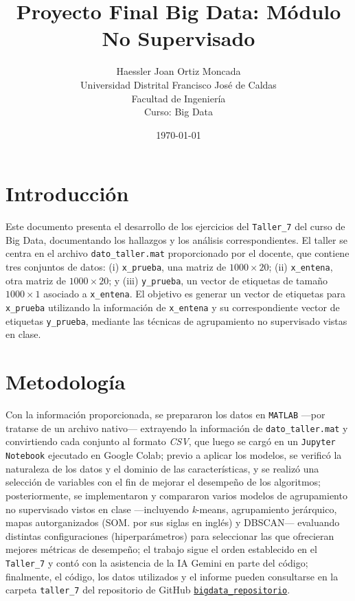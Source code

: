 \documentclass[12pt,a4paper]{article}
\title{\textbf{Proyecto Final Big Data: Módulo No Supervisado}}
\author{Haessler Joan Ortiz Moncada \\[0.5cm]
        Universidad Distrital Francisco José de Caldas \\
        Facultad de Ingeniería \\
        Curso: Big Data}
\date{\today}
\begin{document}
\maketitle

\section{Introducción}
Este documento presenta el desarrollo de los ejercicios del \texttt{Taller\_7} del curso de 
Big Data, documentando los hallazgos y los análisis correspondientes. El taller se centra en 
el archivo \texttt{dato\_taller.mat} proporcionado por el docente, que contiene tres conjuntos 
de datos: (i) \texttt{x\_prueba}, una matriz de \(1000\times 20\); (ii) \texttt{x\_entena}, 
otra matriz de \(1000\times 20\); y (iii) \texttt{y\_prueba}, un vector de etiquetas de tamaño 
\(1000\times 1\) asociado a \texttt{x\_entena}. El objetivo es generar un vector de etiquetas 
para \texttt{x\_prueba} utilizando la información de \texttt{x\_entena} y su correspondiente 
vector de etiquetas \texttt{y\_prueba}, mediante las técnicas de agrupamiento no supervisado 
vistas en clase.

\section{Metodología}
Con la información proporcionada, se prepararon los datos en \texttt{MATLAB} —por tratarse de un 
archivo nativo— extrayendo la información de \texttt{dato\_taller.mat} y convirtiendo cada conjunto 
al formato \emph{CSV}, que luego se cargó en un \texttt{Jupyter Notebook} ejecutado en Google Colab; 
previo a aplicar los modelos, se verificó la naturaleza de los datos y el dominio de las características, 
y se realizó una selección de variables con el fin de mejorar el desempeño de los algoritmos; 
posteriormente, se implementaron y compararon varios modelos de agrupamiento no supervisado vistos en
clase —incluyendo \emph{k}-means, agrupamiento jerárquico, mapas autorganizados (SOM. por sus siglas en inglés) 
y DBSCAN— evaluando distintas configuraciones (hiperparámetros) para seleccionar las que ofrecieran mejores 
métricas de desempeño; el trabajo sigue el orden establecido en el \texttt{Taller\_7} y contó con la asistencia 
de la IA Gemini en parte del código; finalmente, el código, los datos utilizados y el informe pueden consultarse 
en la carpeta \texttt{taller\_7} del repositorio de GitHub \href{https://github.com/HaesslerOrtiz/bigdata}{\texttt{bigdata\_repositorio}}.
\end{document}
